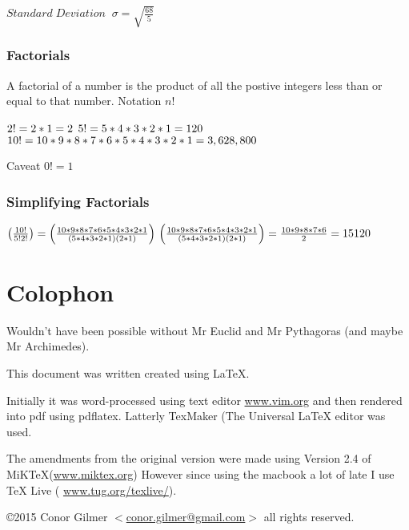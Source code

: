 \documentclass{article}
\begin{document}
$Standard\;Deviation \;\; \sigma = \sqrt{\frac{68}{5}}$

\newpage
\subsubsection{Factorials}
A factorial of a number is the product of all the postive integers less than or equal to that number.
Notation $n!$

$\\ 2! = 2 * 1 = 2 \\$
$ 5! = 5 * 4 * 3 * 2 * 1 = 120\\ $
$ 10! = 10 * 9 * 8 * 7 * 6 * 5 * 4 * 3 * 2 * 1 = 3,628,800 \\$

Caveat $0! = 1 $

\subsubsection{Simplifying Factorials}
$\left(\frac{10!}{5!2!}\right) = \left(\frac{10 * 9 * 8 * 7 * 6 * 5 * 4 * 3 * 2 * 1}{(5 * 4 * 3 * 2 * 1)(2 * 1)}\right)\\
\left(\frac{10 * 9 * 8 * 7 * 6 * 5 * 4 * 3 * 2 * 1}{(5 * 4 * 3 * 2 * 1)(2 * 1)}\right) = \frac{10 * 9 * 8 * 7 * 6 }{2} = 15120\\
$


\newpage
\section{Colophon}

Wouldn't have been possible without Mr Euclid and Mr Pythagoras (and maybe Mr Archimedes).

This document was written created using \LaTeX{}. 

Initially it was word-processed using text editor \href{http://www.vim.org}{www.vim.org} and then rendered into pdf using pdflatex. Latterly TexMaker (The Universal LaTeX editor was used.

The amendments from the original version were made using Version 2.4 of MiKTeX(\href{http://www.miktex.org}{www.miktex.org})
However since using the macbook a lot of late I use \TeX{} Live ( \href{https://www.tug.org/texlive/}{www.tug.org/texlive/}).





\copyright 2015 Conor Gilmer $<$\href{mailto:conor.gilmer@gmail.com}{conor.gilmer@gmail.com}$>$ all rights reserved.
\end{document}
